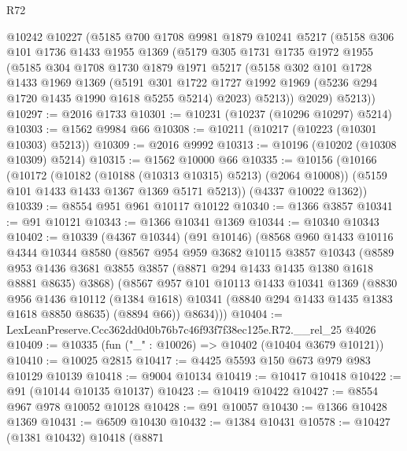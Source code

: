 \begin{lexlean}{R72}
\begin{coremodule}
    @10242
    @10227
    (@5185
      @700
      @1708
      @9981
      @1879
      @10241
      @5217
      (@5158
        @306
        @101
        @1736
        @1433
        @1955
        @1369
        (@5179
          @305
          @1731
          @1735
          @1972
          @1955
          (@5185
            @304
            @1708
            @1730
            @1879
            @1971
            @5217
            (@5158
              @302
              @101
              @1728
              @1433
              @1969
              @1369
              (@5191
                @301
                @1722
                @1727
                @1992
                @1969
                (@5236 @294 @1720 @1435 @1990 @1618 @5255 @5214)
                @2023)
              @5213))
          @2029)
        @5213))
@10297 := @2016 @1733
@10301 := @10231 (@10237 (@10296 @10297) @5214)
@10303 := @1562 @9984 @66
@10308 := @10211 (@10217 (@10223 (@10301 @10303) @5213))
@10309 := @2016 @9992
@10313 := @10196 (@10202 (@10308 @10309) @5214)
@10315 := @1562 @10000 @66
@10335 := @10156
    (@10166
      (@10172
        (@10182 (@10188 (@10313 @10315) @5213) (@2064 @10008))
        (@5159 @101 @1433 @1433 @1367 @1369 @5171 @5213))
      (@4337 @10022 @1362))
@10339 := @8554 @951 @961 @10117 @10122
@10340 := @1366 @3857
@10341 := @91 @10121
@10343 := @1366 @10341 @1369
@10344 := @10340 @10343
@10402 := @10339
    (@4367 @10344)
    (@91 @10146)
    (@8568
      @960
      @1433
      @10116
      @4344
      @10344
      @8580
      (@8567
        @954
        @959
        @3682
        @10115
        @3857
        @10343
        (@8589 @953 @1436 @3681 @3855 @3857 (@8871 @294 @1433 @1435 @1380 @1618 @8881 @8635) @3868)
        (@8567
          @957
          @101
          @10113
          @1433
          @10341
          @1369
          (@8830
            @956
            @1436
            @10112
            (@1384 @1618)
            @10341
            (@8840 @294 @1433 @1435 @1383 @1618 @8850 @8635)
            (@8894 @66))
          @8634)))
@10404 := LexLeanPreserve.Ccc362dd0d0b76b7c46f93f7f38ec125e.R72.__rel_25 @4026
@10409 := @10335 (fun ("_" : @10026) => @10402 (@10404 @3679 @10121))
@10410 := @10025 @2815
@10417 := @4425 @5593 @150 @673 @979 @983 @10129 @10139
@10418 := @9004 @10134
@10419 := @10417 @10418
@10422 := @91 (@10144 @10135 @10137)
@10423 := @10419 @10422
@10427 := @8554 @967 @978 @10052 @10128
@10428 := @91 @10057
@10430 := @1366 @10428 @1369
@10431 := @6509 @10430
@10432 := @1384 @10431
@10578 := @10427
    (@1381 @10432)
    @10418
    (@8871

\end{coremodule}
\end{lexlean}

